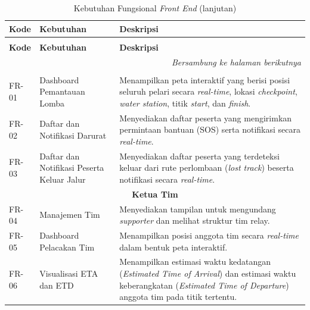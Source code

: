 \begin{longtable}{|p{1.8cm}|p{4cm}|p{7cm}|}
\caption{Kebutuhan Fungsional \textit{Front End}} \\
\hline
\textbf{Kode} & \textbf{Kebutuhan} & \textbf{Deskripsi} \\ \hline
\endfirsthead

\caption[]{Kebutuhan Fungsional \textit{Front End} (lanjutan)} \\
\hline
\textbf{Kode} & \textbf{Kebutuhan} & \textbf{Deskripsi} \\ \hline
\endhead

\hline
\multicolumn{3}{r}{\textit{Bersambung ke halaman berikutnya}} \\
\endfoot

\hline
\endlastfoot

\multicolumn{3}{|c|}{\textbf{Panitia}} \\ \hline

FR-01 & Dashboard Pemantauan Lomba &
Menampilkan peta interaktif yang berisi posisi seluruh pelari secara \textit{real-time}, lokasi \textit{checkpoint}, \textit{water station}, titik \textit{start}, dan \textit{finish}. \\ \hline

FR-02 & Daftar dan Notifikasi Darurat &
Menyediakan daftar peserta yang mengirimkan permintaan bantuan (SOS) serta notifikasi secara \textit{real-time}. \\ \hline

FR-03 & Daftar dan Notifikasi Peserta Keluar Jalur &
Menyediakan daftar peserta yang terdeteksi keluar dari rute perlombaan (\textit{lost track}) beserta notifikasi secara \textit{real-time}. \\ \hline


\multicolumn{3}{|c|}{\textbf{Ketua Tim}} \\ \hline

FR-04 & Manajemen Tim &
Menyediakan tampilan untuk mengundang \textit{supporter} dan melihat struktur tim relay. \\ \hline

FR-05 & Dashboard Pelacakan Tim &
Menampilkan posisi anggota tim secara \textit{real-time} dalam bentuk peta interaktif. \\ \hline

FR-06 & Visualisasi ETA dan ETD &
Menampilkan estimasi waktu kedatangan (\textit{Estimated Time of Arrival}) dan estimasi waktu keberangkatan (\textit{Estimated Time of Departure}) anggota tim pada titik tertentu. \\ \hline


\end{longtable}

